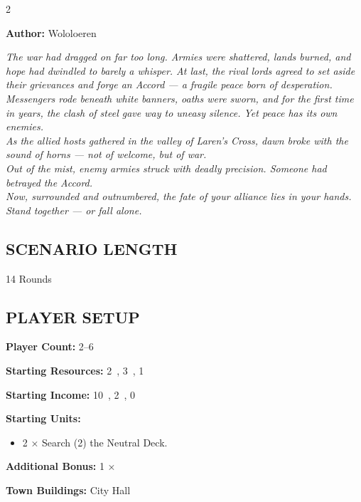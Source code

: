 
\begin{multicols}{2}

\textbf{Author:} Wololoeren

\textit{The war had dragged on far too long. Armies were shattered, lands burned, and hope had dwindled to barely a whisper. At last, the rival lords agreed to set aside their grievances and forge an Accord — a fragile peace born of desperation.\\
Messengers rode beneath white banners, oaths were sworn, and for the first time in years, the clash of steel gave way to uneasy silence. Yet peace has its own enemies.\\
As the allied hosts gathered in the valley of Laren's Cross, dawn broke with the sound of horns — not of welcome, but of war.\\
Out of the mist, enemy armies struck with deadly precision. Someone had betrayed the Accord.\\Now, surrounded and outnumbered, the fate of your alliance lies in your hands. Stand together — or fall alone.}  %

\subsection*{\MakeUppercase{Scenario Length}}
14 Rounds

\subsection*{\MakeUppercase{Player Setup}}

\textbf{Player Count:} 2--6

\textbf{Starting Resources:} 2~, 3~, 1~

\textbf{Starting Income:} 10~, 2~, 0~

\textbf{Starting Units:}

\begin{itemize}
  \item 2 × Search (2) the  Neutral Deck.
\end{itemize}

\textbf{Additional Bonus:} 1 × 

\textbf{Town Buildings:} City Hall


\end{multicols}
